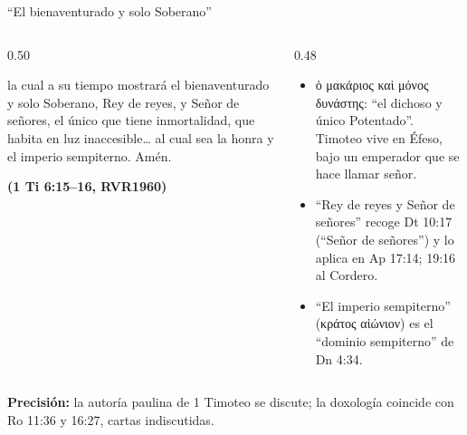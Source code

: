 \documentclass[hyperref={bookmarks=false},aspectratio=169]{beamer}
\newcommand{\grc}[1]{\foreignlanguage{ancientgreek}{#1}}
\newcommand{\fuente}[1]{\par\hfill{\upshape\bfseries\footnotesize\textcolor{azul}{#1}}}
\newcommand{\precision}[1]{{\footnotesize\color{gris}\textbf{Precisión:} #1}}
\begin{document}
\begin{frame}{``El bienaventurado y solo Soberano''}
\begin{columns}[t,onlytextwidth]
\begin{column}{0.50\textwidth}
\begin{cita}la cual a su tiempo mostrará el bienaventurado y solo Soberano, Rey de reyes, y Señor de señores, el único que tiene inmortalidad, que habita en luz inaccesible\ldots{} al cual sea la honra y el imperio sempiterno. Amén.\fuente{(1 Ti 6:15--16, RVR1960)}\end{cita}
\end{column}
\begin{column}{0.48\textwidth}\small
\begin{itemize}
\item \grc{ὁ μακάριος καὶ μόνος δυνάστης}: ``el dichoso y único Potentado''. Timoteo vive en Éfeso, bajo un emperador que se hace llamar señor.
\item ``Rey de reyes y Señor de señores'' recoge Dt 10:17 (``Señor de señores'') y lo aplica en Ap 17:14; 19:16 al Cordero.
\item ``El imperio sempiterno'' (\grc{κράτος αἰώνιον}) es el ``dominio sempiterno'' de Dn 4:34.
\end{itemize}
\end{column}
\end{columns}\par\smallskip
\precision{la autoría paulina de 1 Timoteo se discute; la doxología coincide con Ro 11:36 y 16:27, cartas indiscutidas.}
\end{frame}
\end{document}
